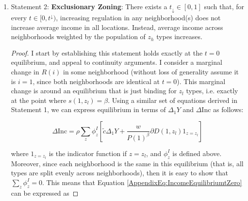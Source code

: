 \documentclass[12pt]{article}
\begin{document}
\begin{enumerate}
\begin{proof}
			\paragraph*{}
			Finally,  $\frac{\partial \text{Inc}(i)}{\partial I(1)}$ is continuous in $t$\footnote{By virtue of equilibrium values of $\text{Inc}(i)$ being differentiable in exogenous variables, which is a consequence of the differentiability of the equilibrium system and the Implicit function theorem.} and I established is strictly positive for every $i$ at the $t = 1$ equilibrium. By the Intermediate Value Theorem, there exists a $\tilde{t}(i)$ such that, for all $t(i) \in (\tilde{t}(i), 1]$, $\frac{\partial \text{Inc}_{\tilde{t}(i)}(i)}{\partial I(1)} > 0$. Define $t^{\uparrow} = \max_{i \in \{0, 1\}}\tilde{t}(i)$, which proves the statement. 
			
		\end{proof}
		
		
		\item Statement 2: \textbf{Exclusionary Zoning}: There exists a $t_{\downarrow} \in [0, 1]$ such that, for every $t \in [0, t^{\downarrow})$, increasing regulation in any neighborhood(s) does not increase average income in all locations. Instead, average income across neighborhoods weighted by the population of $z_{h}$ types increases. 
		
		\begin{proof}
			I start by establishing this statement holds exactly at the $t = 0$ equilibrium, and appeal to continuity arguments. I consider a marginal change in $R(i)$ in some neighborhood (without loss of generality assume it is $i = 1$, since both neighborhoods are identical at $t = 0$). This marginal change is around an equilibrium that is just binding for $z_{l}$ types, i.e. exactly at the point where $s(1, z_{l}) = \beta$. Using a similar set of equations derived in Statement 1, we can express equilibrium in terms of $\Delta_{1}Y$ and $\Delta \text{Inc}$ as follows:
			
			\begin{equation}\label{AppendixEq:IncomeEquilibriumtZero}
				\Delta \text{Inc} = \rho \sum_{z}\phi^{I}_{z}[\tilde{c} \Delta_{1} Y + \frac{w}{P(1)^{\beta}}\partial D(1, z_{l})1_{z = z_{l}}] 
			\end{equation}
			
			where $1_{z = z_{l}}$ is the indicator function if $z = z_{l}$, and $\phi^{I}_{z}$ is defined above. Moreover, since each neighborhood is the same in this equilibrium (that is, all types are split evenly across neighborhoods), then it is easy to show that $\sum_{z}\phi^{I}_{z} = 0$. This means that Equation \eqref{AppendixEq:IncomeEquilibriumtZero} can be expressed as 
			

\end{proof}
\end{enumerate}
\end{document}
